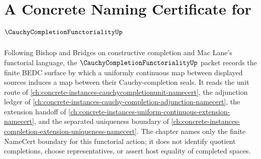 \chapter{A Concrete Naming Certificate for $\CauchyCompletionFunctorialityUp$}
\label{ch:concrete-instances-cauchy-completion-functoriality-namecert}

Following Bishop and Bridges on constructive completion and Mac Lane's functorial language, the $\CauchyCompletionFunctorialityUp$ packet records the finite BEDC surface by which a uniformly continuous map between displayed sources induces a map between their Cauchy-completion seals. It reads the unit route of \autoref{ch:concrete-instances-cauchycompletionunit-namecert}, the adjunction ledger of \autoref{ch:concrete-instances-cauchy-completion-adjunction-namecert}, the extension handoff of \autoref{ch:concrete-instances-uniform-continuous-extension-namecert}, and the separated uniqueness boundary of \autoref{ch:concrete-instances-completion-extension-uniqueness-namecert}. The chapter names only the finite NameCert boundary for this functorial action; it does not identify quotient completions, choose representatives, or assert host equality of completed spaces.

